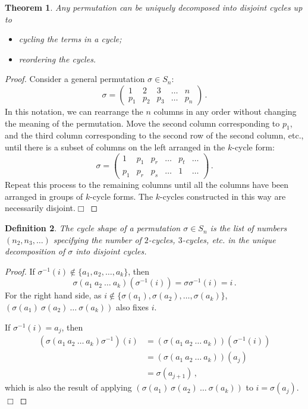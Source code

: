 \documentclass{article}
\theoremstyle{plain}\theoremheaderfont{\normalfont\itshape}\theorembodyfont{\rmfamily}\theoremseparator{.}\newtheorem*{rem}{Remark}\newtheorem*{ex}{Example}\newtheorem*{proof}{Proof}\newtheorem*{altp}{Alternative proof}
\theoremstyle{plain}\theoremheaderfont{\normalfont\bfseries}\theorembodyfont{\rmfamily}\theoremseparator{.}\newtheorem{thm}{Theorem}[section]\newtheorem{lem}[thm]{Lemma}\newtheorem{prop}[thm]{Proposition}\newtheorem*{cor}{Corollary}\newtheorem{defn}[thm]{Definition}\newtheorem{clm}[thm]{Claim}\newtheorem{clminproof}{Claim}
\theoremstyle{break}\theoremheaderfont{\normalfont\itshape}\theorembodyfont{\rmfamily}\theoremseparator{.\medskip}\newtheorem*{proofskip}{Proof}\newtheorem*{exs}{Examples}\newtheorem*{rems}{Remarks}
\theoremstyle{break}\theoremheaderfont{\normalfont\bfseries}\theorembodyfont{\rmfamily}\theoremseparator{.\medskip}\newtheorem{lemskip}[thm]{Lemma}\newtheorem{defnskip}[thm]{Definition}\newtheorem{propskip}[thm]{Proposition}\newtheorem{thmskip}[thm]{Theorem}
\numberwithin{equation}{section}
\newcommand{\qed}{\hfill\ensuremath{\Box}}
\begin{document}
	\begin{thm}
		Any permutation can be uniquely decomposed into disjoint cycles up to
		\begin{itemize}[topsep=0pt]
			\item cycling the terms in a cycle;
			\item reordering the cycles.
		\end{itemize}
	\end{thm}
	\begin{proof}
		Consider a general permutation \(\sigma\in S_n\):
		\[\sigma=\begin{pmatrix}
			1 & 2 & 3 & \dots & n\\
			p_1 & p_2 & p_3 & \dots & p_n
		\end{pmatrix}\,.\]
		In this notation, we can rearrange the \(n\) columns in any order without changing the meaning of the permutation. Move the second column corresponding to \(p_1\), and the third column corresponding to the second row of the second column, etc., until there is a subset of columns on the left arranged in the \(k\)-cycle form:
		\[\sigma=\begin{pmatrix}
			1 & p_1 & p_r & \dots & p_t & \dots\\
			p_1 & p_r & p_s & \dots & 1 & \dots
		\end{pmatrix}\,.\]
		Repeat this process to the remaining columns until all the columns have been arranged in groups of \(k\)-cycle forms. The \(k\)-cycles constructed in this way are necessarily disjoint.\qed
	\end{proof}
	\begin{defn}
		The \textit{cycle shape} of a permutation \(\sigma\in S_n\) is the list of numbers \((n_2,n_3,\dots)\) specifying the number of \(2\)-cycles, \(3\)-cycles, etc. in the unique decomposition of \(\sigma\) into disjoint cycles.
	\end{defn}
	\begin{lem}\label[lem]{conjcyc}
		If \(\sigma\in S_n\), then
		\[\sigma(a_1~a_2~\dots~a_k)\sigma^{-1}=(\sigma(a_1)~\sigma(a_2)~\dots~\sigma(a_k))\,.\]
	\end{lem}
	\begin{proof}
		If \(\sigma^{-1}(i)\notin\{a_1,a_2,\dots,a_k\}\), then
		\[\sigma(a_1~a_2~\dots~a_k)(\sigma^{-1}(i))=\sigma\sigma^{-1}(i)=i\,.\]
		For the right hand side, as \(i\notin\{\sigma(a_1),\sigma(a_2),\dots,\sigma(a_k)\}\), \((\sigma(a_1)~\sigma(a_2)~\dots~\sigma(a_k))\) also fixes \(i\).

		If \(\sigma^{-1}(i)=a_j\), then
		\begin{align*}
			(\sigma(a_1~a_2~\dots~a_k)\sigma^{-1})(i)&=(\sigma(a_1~a_2~\dots~a_k))(\sigma^{-1}(i))\\
			&=(\sigma(a_1~a_2~\dots~a_k))(a_j)\\
			&=\sigma(a_{j+1})\,,
		\end{align*}
		which is also the result of applying \((\sigma(a_1)~\sigma(a_2)~\dots~\sigma(a_k))\) to \(i=\sigma(a_j)\).\qed
	\end{proof}
\end{document}
